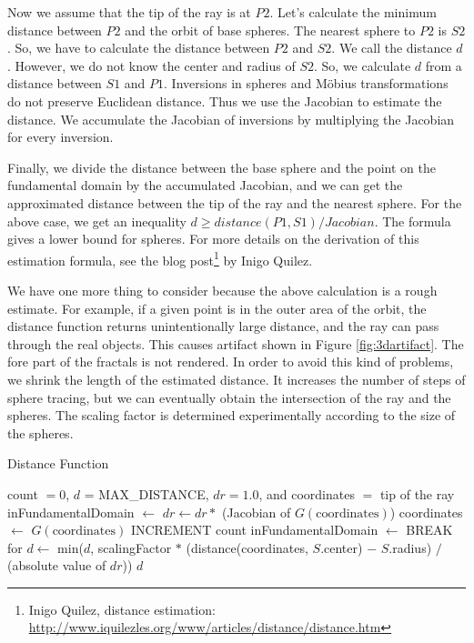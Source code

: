 Now we assume that the tip of the ray is at $P2$.
Let's calculate the minimum distance between
$P2$ and the orbit of base spheres.
The nearest sphere to $P2$ is $S2$.
So, we have to calculate the distance between $P2$ and $S2$.
We call the distance $d$.
However, we do not know the center and radius of $S2$.
So, we calculate $d$ from a distance between $S1$ and $P1$.
Inversions in spheres and M\"obius transformations do not preserve
Euclidean distance.
Thus we use the Jacobian to estimate the distance.
We accumulate the Jacobian of inversions by multiplying the Jacobian for
every inversion.

Finally, we divide the distance between the base sphere and the point on
the fundamental domain by the accumulated Jacobian, and we can get the
approximated distance between the tip of the ray and the nearest sphere.
For the above case, we get an inequality $d \geq distance(P1, S1)/Jacobian$.
The formula gives a lower bound for spheres.
For more details on the derivation of this estimation formula, see the
blog post\footnote{Inigo Quilez, distance estimation:
\url{http://www.iquilezles.org/www/articles/distance/distance.htm}}
by Inigo Quilez.

We have one more thing to consider because the above calculation is
a rough estimate.
For example, if a given point is in the outer area of the orbit, the
distance function returns unintentionally large distance, and the ray
can pass through the real objects. This causes artifact shown in Figure
\ref{fig:3dartifact}. The fore part of the fractals is not rendered.
In order to avoid this kind of problems, we shrink the length of
the estimated distance.
It increases the number of steps of sphere tracing, but we can
eventually obtain the intersection of the ray and the spheres.
The scaling factor is determined experimentally according to the size of
the spheres.

\begin{algorithm}
 \caption{Distance Function}
 \label{iis3d}
 \begin{algorithmic}
  \REQUIRE count $= 0$, $d$ = MAX\_DISTANCE, $dr = 1.0$, and coordinates
  $=$ tip of the ray
  \STATE inFundamentalDomain $\leftarrow$ \TRUE
  \STATE $dr \leftarrow dr * $ (Jacobian of $G(\text{coordinates})$)
  \STATE coordinates $\leftarrow$ $G(\text{coordinates})$
  \STATE INCREMENT count
  \STATE inFundamentalDomain $\leftarrow$ \FALSE
  \ENDIF
  \ENDFOR
  \STATE BREAK for
  \ENDIF
  \ENDFOR
  \STATE $d \leftarrow$ min($d$, scalingFactor $*$ (distance(coordinates, $S$.center) $-$
  $S$.radius) $/$ (absolute value of $dr$))
  \ENDFOR
  \RETURN $d$
 \end{algorithmic}
\end{algorithm}

